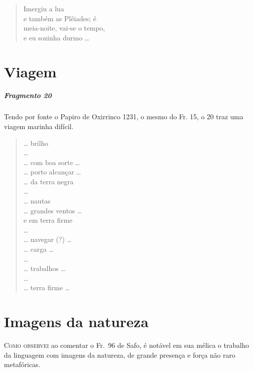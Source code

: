 {\begin{verse}
Imergiu a lua\\
e também as Plêiades; é\\
meia-noite, vai-se o tempo,\\
e eu sozinha durmo \ldots{}
\end{verse}

\chapter{Viagem}

\paragraph{Fragmento 20}

{\small Tendo por fonte o Papiro de Oxirrinco 1231, o mesmo do Fr. 15, o 20 traz uma viagem marinha difícil.}

\begin{verse}
\ldots{} brilho\\
\ldots{}\\
\ldots{} com boa sorte \ldots{}\\
\ldots{} porto alcançar \ldots{} \\
\ldots{} da terra negra\\
\ldots{} \\
\ldots{} nautas\\
\ldots{} grandes ventos \ldots{}\\
e em terra firme\\
\ldots{}\\
\ldots{} navegar (?) \ldots{}\\
\ldots{} carga \ldots{}\\
\ldots{}\\
\ldots{} trabalhos \ldots{}\\
\ldots{}\\
\ldots{} terra firme \ldots{}
\end{verse}


\chapter{Imagens da natureza}

\textsc{Como observei} ao comentar o Fr.~96 de Safo, é notável em sua mélica o trabalho
da linguagem com imagens da natureza, de grande presença e força não raro
metafóricas.

}

